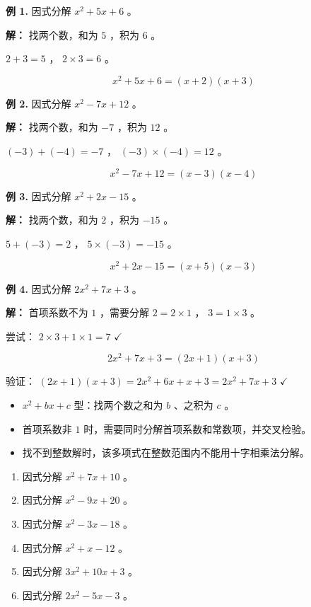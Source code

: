 \begin{workedexamples}


\textbf{例 1.} 因式分解 $x^2 + 5x + 6$ 。

\textbf{解：} 找两个数，和为 $5$ ，积为 $6$ 。

$2 + 3 = 5$ ， $2 \times 3 = 6$ 。

\[
x^2 + 5x + 6 = (x + 2)(x + 3)
\]


\textbf{例 2.} 因式分解 $x^2 - 7x + 12$ 。

\textbf{解：} 找两个数，和为 $-7$ ，积为 $12$ 。

$(-3) + (-4) = -7$ ， $(-3) \times (-4) = 12$ 。

\[
x^2 - 7x + 12 = (x - 3)(x - 4)
\]


\textbf{例 3.} 因式分解 $x^2 + 2x - 15$ 。

\textbf{解：} 找两个数，和为 $2$ ，积为 $-15$ 。

$5 + (-3) = 2$ ， $5 \times (-3) = -15$ 。

\[
x^2 + 2x - 15 = (x + 5)(x - 3)
\]


\textbf{例 4.} 因式分解 $2x^2 + 7x + 3$ 。

\textbf{解：} 首项系数不为 $1$ ，需要分解 $2 = 2 \times 1$ ， $3 = 1 \times 3$ 。

尝试： $2 \times 3 + 1 \times 1 = 7$ $\checkmark$

\[
2x^2 + 7x + 3 = (2x + 1)(x + 3)
\]


验证： $(2x + 1)(x + 3) = 2x^2 + 6x + x + 3 = 2x^2 + 7x + 3$ $\checkmark$

\end{workedexamples}

\begin{keytakeaway}


\begin{itemize}
  \item $x^2 + bx + c$ 型：找两个数之和为 $b$ 、之积为 $c$ 。
  \item 首项系数非 $1$ 时，需要同时分解首项系数和常数项，并交叉检验。
  \item 找不到整数解时，该多项式在整数范围内不能用十字相乘法分解。
\end{itemize}


\end{keytakeaway}

\begin{practice}


\begin{enumerate}
  \item 因式分解 $x^2 + 7x + 10$ 。
  \item 因式分解 $x^2 - 9x + 20$ 。
  \item 因式分解 $x^2 - 3x - 18$ 。
  \item 因式分解 $x^2 + x - 12$ 。
  \item 因式分解 $3x^2 + 10x + 3$ 。
  \item 因式分解 $2x^2 - 5x - 3$ 。
\end{enumerate}


\end{practice}


